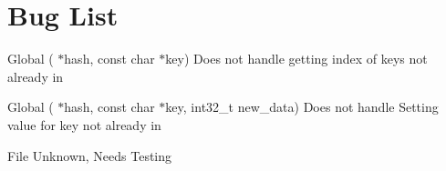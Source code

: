 \chapter{Bug List}
\hypertarget{bug}{}\label{bug}

\begin{DoxyRefList}
\item[Global \doxylink{hash__table_8h_a27578c1b5a3ab68d8f144ed86ea72cc2}{Hash\+\_\+\+Get\+Value} (\doxylink{struct_hash_table}{Hash\+Table} \texorpdfstring{$\ast$}{*}hash, const char \texorpdfstring{$\ast$}{*}key)]\label{bug__bug000001}%
%
Does not handle getting index of keys not already in   
\item[Global \doxylink{hash__table_8h_a3895b9b37a2ed859af17b8d22e06bab0}{Hash\+\_\+\+Set\+Value} (\doxylink{struct_hash_table}{Hash\+Table} \texorpdfstring{$\ast$}{*}hash, const char \texorpdfstring{$\ast$}{*}key, int32\+\_\+t new\+\_\+data)]\label{bug__bug000002}%
%
Does not handle Setting value for key not already in   
\item[File \doxylink{var_int_file___i_o_8h}{var\+Int\+File\+\_\+\+IO.h} ]\label{bug__bug000003}%
%
Unknown, Needs Testing 
\end{DoxyRefList}